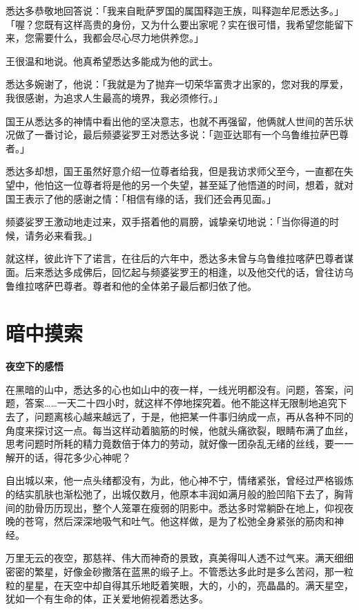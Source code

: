 \documentclass[12pt,twoside,openany]{book}
\newcommand{\mt}[1]{\textbullet \textbf{#1}}
\begin{document}
悉达多恭敬地回答说：「我来自毗萨罗国的属国释迦王族，叫释迦牟尼\textperiodcentered 悉达多。」「喔？您既有这样高贵的身份，又为什么要出家呢？实在很可惜，我希望您能留下来，您需要什么，我都会尽心尽力地供养您。」

王很温和地说。他真希望悉达多能成为他的武士。

悉达多婉谢了，他说：「我就是为了抛弃一切荣华富贵才出家的，您对我的厚爱，我很感谢，为追求人生最高的境界，我必须修行。」

国王从悉达多的神情中看出他的坚决意志，也就不再强留，他俩就人世间的苦乐状况做了一番讨论，最后频婆娑罗王对悉达多说：「迦亚达耶有一个乌鲁维拉萨巴尊者。」

悉达多却想，国王虽然好意介绍一位尊者给我，但是我访求师父至今，一直都在失望中，他怕这一位尊者将是他的另一个失望，甚至延了他悟道的时间，想着，就对国王表示了他的感谢之情：「相信有缘的话，我们还会再见面。」

频婆娑罗王激动地走过来，双手搭着他的肩膀，诚挚亲切地说：「当你得道的时候，请务必来看我。」

就这样，彼此许下了诺言，在往后的六年中，悉达多未曾与乌鲁维拉喀萨巴尊者谋面。后来悉达多成佛后，回忆起与频婆娑罗王的相逢，以及他交代的话，曾往访乌鲁维拉喀萨巴尊者。尊者和他的全体弟子最后都归依了他。

\section{暗中摸索}\label{sec1.7}

\mt{夜空下的感悟}

在黑暗的山中，悉达多的心也如山中的夜一样，一线光明都没有。问题，答案，问题，答案……一天二十四小时，就这样不停地探究着。他不能这样无限制地追究下去了，问题离核心越来越远了，于是，他把某一件事归纳成一点，再从各种不同的角度来探讨这一点。每当这样动着脑筋的时候，他就头痛欲裂，眼睛布满了血丝，思考问题时所耗的精力竟数倍于体力的劳动，就好像一团杂乱无绪的丝线，要一一解开的话，得花多少心神呢？

自出城以来，他一点头绪都没有，为此，他心神不宁，情绪紧张，曾经过严格锻炼的结实肌肤也渐松弛了，出城仅数月，他原本丰润如满月般的脸凹陷下去了，胸背间的肋骨历历现出，整个人笼罩在瘦弱的阴影中。悉达多时常躺卧在地上，仰视夜晚的苍穹，然后深深地吸气和吐气。他这样做，是为了松弛全身紧张的筋肉和神经。

万里无云的夜空，那慈祥、伟大而神奇的景致，真美得叫人透不过气来。满天细细密密的繁星，好像金砂撒落在蓝黑的缎子上。不管悉达多此时是多么苦闷，那一粒粒的星星，在天空中却自得其乐地眨着笑眼，大的，小的，亮晶晶的。满天星空，犹如一个有生命的体，正关爱地俯视着悉达多。
\end{document}
